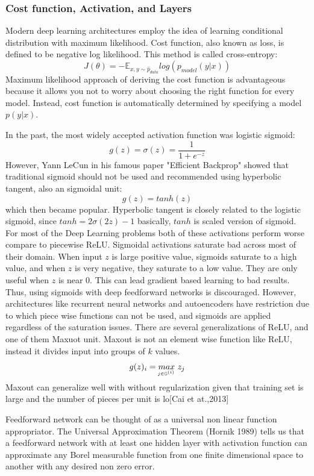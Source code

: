 \documentclass[paper=a4, fontsize=11pt]{scrartcl}
\numberwithin{equation}{section}		%
\numberwithin{figure}{section}			%
\numberwithin{table}{section}			%
\begin{document}
	\subsubsection{Cost function, Activation, and Layers} 
	Modern deep learning architectures employ the idea of learning conditional distribution with maximum likelihood. Cost function, also known as loss, is defined to be negative log likelihood. This method is called cross-entropy:
	$$ J(\theta) = -\mathbb E_{x,y \sim \hat{p}_{data}}log(p_{model}(y|x))$$
	Maximum likelihood approach of deriving the cost function is advantageous because it allows you not to worry about choosing the right function for every model. Instead, cost function is automatically determined by specifying a model $p(y|x)$.
	
	
	In the past, the most widely accepted activation function was logistic sigmoid:
	 $$ g(z) = \sigma(z) = \frac{1}{1 + e^{-z}}$$
	However, Yann LeCun in his famous paper "Efficient Backprop" showed that traditional sigmoid should not be used and recommended using hyperbolic tangent, also an sigmoidal unit:
	$$ g(z) = tanh(z) $$
	which then became popular. Hyperbolic tangent is closely related to the logistic sigmoid, since $tanh = 2\sigma (2z)-1$ basically, $ tanh $ is scaled version of sigmoid. For most of the Deep Learning problems both of these activations perform worse compare to piecewise ReLU. Sigmoidal activations saturate bad across most of their domain. When input $z$ is large positive value, sigmoids saturate to a high value, and when $z$ is very negative, they saturate to a low value. They are only useful when $z$ is near 0. This can lead gradient based learning to bad results. Thus, using sigmoids with deep feedforward networks is discouraged. However, architectures like recurrent neural networks and autoencoders have restriction due to which piece wise functions can not be used, and sigmoids are applied regardless of the saturation issues. There are several generalizations of ReLU, and one of them Maxuot unit. Maxout is not an element wise function like ReLU, instead it divides input into groups of $k$ values. 
		$$ g(z)_i = \underaccent{j \in \mathbb G^{(i)}}{max} \ z_j$$
	Maxout can generalize well with without regularization given that training set is large and the number of pieces per unit is lo[Cai et at.,2013]
	\par Feedforward network can be thought of as a universal non linear function appropriator. The Universal Approximation Theorem (Hornik 1989) tells us that a feedforward network with at least one hidden layer with activation function can approximate any Borel measurable function from one finite dimensional space to another with any desired non zero error.
	
\end{document}
